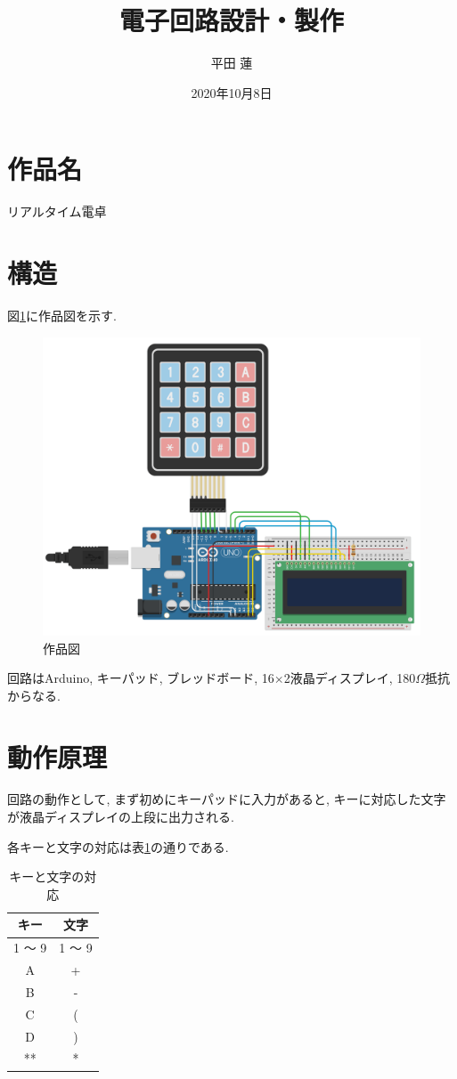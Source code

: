 \documentclass[titlepage]{jsarticle}
\title{電子回路設計・製作}
\author{平田 蓮}
\date{2020年10月8日}
\begin{document}
\maketitle
\section{作品名}
    リアルタイム電卓

\section{構造}
    図\ref{fig:circuit}に作品図を示す.

    \begin{figure}[h]
        \centering
        \includegraphics[width=12cm]{img/circuit.png}
        \caption{作品図}
        \label{fig:circuit}
    \end{figure}

    回路はArduino, キーパッド, ブレッドボード, 16$\times$2液晶ディスプレイ, 180$\Omega$抵抗からなる.

\section{動作原理}
    回路の動作として, まず初めにキーパッドに入力があると, キーに対応した文字が液晶ディスプレイの上段に出力される.

    各キーと文字の対応は表\ref{tab:keys}の通りである.

    \begin{table}[h]
        \centering
        \caption{キーと文字の対応}
        \label{tab:keys}
        \begin{tabular}{c|c}
            キー & 文字 \\ \hline
            1 〜 9 & 1 〜 9 \\
            A & + \\
            B & - \\
            C & ( \\
            D & ) \\
            ** & * \\
        \end{tabular}
    \end{table}
\end{document}
